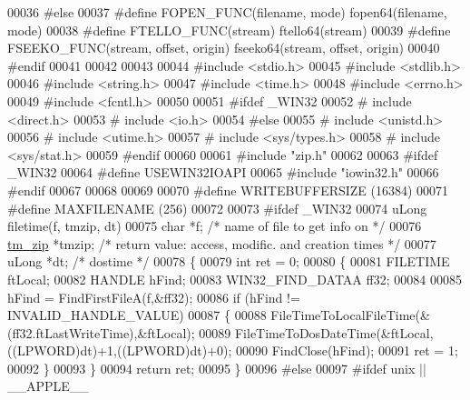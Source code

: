 \begin{DoxyCode}
00036 \textcolor{preprocessor}{#else}
00037 \textcolor{preprocessor}{#define FOPEN\_FUNC(filename, mode) fopen64(filename, mode)}
00038 \textcolor{preprocessor}{#define FTELLO\_FUNC(stream) ftello64(stream)}
00039 \textcolor{preprocessor}{#define FSEEKO\_FUNC(stream, offset, origin) fseeko64(stream, offset, origin)}
00040 \textcolor{preprocessor}{#endif}
00041 
00042 
00043 
00044 \textcolor{preprocessor}{#include <stdio.h>}
00045 \textcolor{preprocessor}{#include <stdlib.h>}
00046 \textcolor{preprocessor}{#include <string.h>}
00047 \textcolor{preprocessor}{#include <time.h>}
00048 \textcolor{preprocessor}{#include <errno.h>}
00049 \textcolor{preprocessor}{#include <fcntl.h>}
00050 
00051 \textcolor{preprocessor}{#ifdef \_WIN32}
00052 \textcolor{preprocessor}{# include <direct.h>}
00053 \textcolor{preprocessor}{# include <io.h>}
00054 \textcolor{preprocessor}{#else}
00055 \textcolor{preprocessor}{# include <unistd.h>}
00056 \textcolor{preprocessor}{# include <utime.h>}
00057 \textcolor{preprocessor}{# include <sys/types.h>}
00058 \textcolor{preprocessor}{# include <sys/stat.h>}
00059 \textcolor{preprocessor}{#endif}
00060 
00061 \textcolor{preprocessor}{#include "zip.h"}
00062 
00063 \textcolor{preprocessor}{#ifdef \_WIN32}
00064 \textcolor{preprocessor}{        #define USEWIN32IOAPI}
00065 \textcolor{preprocessor}{        #include "iowin32.h"}
00066 \textcolor{preprocessor}{#endif}
00067 
00068 
00069 
00070 \textcolor{preprocessor}{#define WRITEBUFFERSIZE (16384)}
00071 \textcolor{preprocessor}{#define MAXFILENAME (256)}
00072 
00073 \textcolor{preprocessor}{#ifdef \_WIN32}
00074 uLong filetime(f, tmzip, dt)
00075     \textcolor{keywordtype}{char} *f;                \textcolor{comment}{/* name of file to get info on */}
00076     \hyperlink{structtm__zip__s}{tm\_zip} *tmzip;             \textcolor{comment}{/* return value: access, modific. and creation times */}
00077     uLong *dt;             \textcolor{comment}{/* dostime */}
00078 \{
00079   \textcolor{keywordtype}{int} ret = 0;
00080   \{
00081       FILETIME ftLocal;
00082       HANDLE hFind;
00083       WIN32\_FIND\_DATAA ff32;
00084 
00085       hFind = FindFirstFileA(f,&ff32);
00086       \textcolor{keywordflow}{if} (hFind != INVALID\_HANDLE\_VALUE)
00087       \{
00088         FileTimeToLocalFileTime(&(ff32.ftLastWriteTime),&ftLocal);
00089         FileTimeToDosDateTime(&ftLocal,((LPWORD)dt)+1,((LPWORD)dt)+0);
00090         FindClose(hFind);
00091         ret = 1;
00092       \}
00093   \}
00094   \textcolor{keywordflow}{return} ret;
00095 \}
00096 \textcolor{preprocessor}{#else}
00097 \textcolor{preprocessor}{#ifdef unix || \_\_APPLE\_\_}

\end{DoxyCode}
